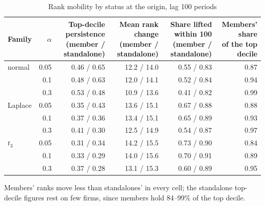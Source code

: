 \begin{table}
\centering
\caption{Rank mobility by status at the origin, lag 100 periods}
\label{tab:a17b_rank_mobility_status}
\small
\begin{tabular}{lrrrrr}
\toprule
Family & $\alpha$ & \makecell[b]{Top-decile persistence\\{}(member / standalone)} & \makecell[b]{Mean rank change\\{}(member / standalone)} & \makecell[b]{Share lifted within 100\\{}(member / standalone)} & \makecell[b]{Members' share\\{}of the top decile} \\
\midrule
normal & 0.05 & 0.46 / 0.65 & 12.2 / 14.0 & 0.55 / 0.83 & 0.87 \\
 & 0.1 & 0.48 / 0.63 & 12.0 / 14.1 & 0.52 / 0.84 & 0.94 \\
 & 0.3 & 0.53 / 0.48 & 10.9 / 13.6 & 0.41 / 0.82 & 0.99 \\
Laplace & 0.05 & 0.35 / 0.43 & 13.6 / 15.1 & 0.67 / 0.88 & 0.88 \\
 & 0.1 & 0.37 / 0.36 & 13.4 / 15.1 & 0.65 / 0.89 & 0.93 \\
 & 0.3 & 0.41 / 0.30 & 12.5 / 14.9 & 0.54 / 0.87 & 0.97 \\
$t_3$ & 0.05 & 0.31 / 0.34 & 14.2 / 15.5 & 0.73 / 0.90 & 0.84 \\
 & 0.1 & 0.33 / 0.29 & 14.0 / 15.6 & 0.70 / 0.91 & 0.89 \\
 & 0.3 & 0.37 / 0.28 & 13.1 / 15.3 & 0.60 / 0.89 & 0.95 \\
\bottomrule
\end{tabular}
\par\smallskip\begin{minipage}{0.95\linewidth}\footnotesize Members' ranks move less than standalones' in every cell; the standalone top-decile figures rest on few firms, since members hold 84--99\% of the top decile.\end{minipage}
\end{table}
